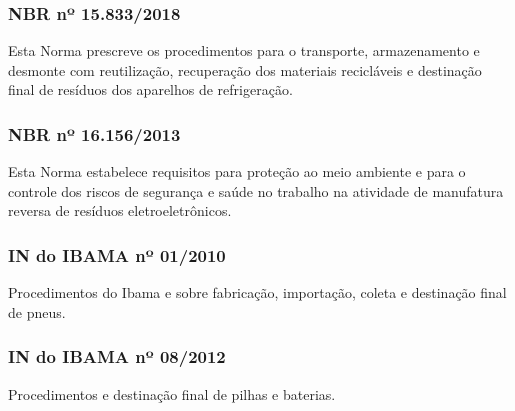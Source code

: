 \begin{subapend}
\begin{subsubapend}
		\subsubsection{NBR nº 15.833/2018}
		Esta Norma prescreve os procedimentos para o transporte, armazenamento e desmonte com reutilização, recuperação dos materiais recicláveis e destinação final de resíduos dos aparelhos de refrigeração.
		\subsubsection{NBR nº 16.156/2013}
		Esta Norma estabelece requisitos para proteção ao meio ambiente e para o controle dos riscos de segurança e saúde no trabalho na atividade de manufatura reversa de resíduos eletroeletrônicos.
		\subsubsection{IN do IBAMA nº 01/2010}
		Procedimentos do Ibama e sobre fabricação, importação, coleta e destinação final de pneus.
		\subsubsection{IN do IBAMA nº 08/2012}
		Procedimentos e destinação final de pilhas e baterias.
	\end{subsubapend}
\end{subapend}

